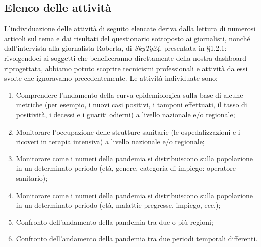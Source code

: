 \subsection{Elenco delle attività}
\label{ss:elenco-attivita}
L'individuazione delle attività di seguito elencate deriva dalla lettura di numerosi articoli sul tema e dai risultati del questionario sottoposto ai giornalisti, nonché dall'intervista alla giornalista Roberta, di \textit{SkyTg24}, presentata in §1.2.1: rivolgendoci ai soggetti che beneficeranno direttamente della nostra dashboard riprogettata, abbiamo potuto scoprire tecnicismi professionali e attività da essi svolte che ignoravamo precedentemente.
\noindent
Le attività individuate sono:
\begin{enumerate}
    \item Comprendere l'andamento della curva epidemiologica sulla base di alcune metriche (per esempio, i nuovi casi positivi, i tamponi effettuati, il tasso di positività, i decessi e i guariti odierni) a livello nazionale e/o regionale;\label{itm:1}
    \item Monitorare l'occupazione delle strutture sanitarie (le ospedalizzazioni e i ricoveri in terapia intensiva) a livello nazionale e/o regionale;\label{itm:2}
    \item Monitorare come i numeri della pandemia si distribuiscono sulla popolazione in un determinato periodo (età, genere, categoria di impiego: operatore sanitario);\label{itm:3}
    \item Monitorare come i numeri della pandemia si distribuiscono sulla popolazione in un determinato periodo (età, malattie pregresse, impiego, ecc.);\label{itm:4}
    \item Confronto dell'andamento della pandemia tra due o più regioni;\label{itm:5}
    \item Confronto dell'andamento della pandemia tra due periodi temporali differenti.\label{itm:6}
\end{enumerate}

